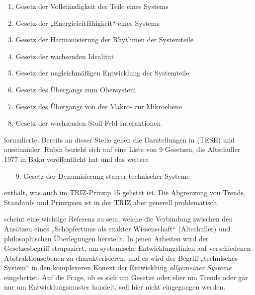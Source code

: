 \documentclass[11pt,a4paper]{article}
\begin{document}
\begin{enumerate}[noitemsep]
\item Gesetz der Vollständigkeit der Teile eines Systems
\item Gesetz der „Energieleitfähigkeit“ eines Systems
\item Gesetz der Harmonisierung der Rhythmen der Systemteile
\item Gesetz der wachsenden Idealität
\item Gesetz der ungleichmäßigen Entwicklung der Systemteile
\item Gesetz des Übergangs zum Obersystem
\item Gesetz des Übergangs von der Makro- zur Mikroebene
\item Gesetz der wachsenden Stoff-Feld-Interaktionen
\end{enumerate}
formulierte. Bereits an dieser Stelle gehen die Darstellungen in (TESE) und
\cite{Rubin2019} auseinander. Rubin bezieht sich auf eine Liste von 9 Gesetzen,
die Altschuller 1977 in Baku veröffentlicht hat und das weitere
\begin{enumerate}[noitemsep]
\item[9.] Gesetz der Dynamisierung starrer technischer Systeme
\end{enumerate}
enthält, was auch im TRIZ-Prinzip 15 gelistet ist. Die Abgrenzung von Trends,
Standards und Prinzipien ist in der TRIZ aber generell problematisch.

\cite{Goldovsky1983} scheint eine wichtige Referenz zu sein, welche die
Verbindung zwischen den Ansätzen eines „Schöpfertums als exakter Wissenschaft“
(Altschuller) und philosophischen Überlegungen herstellt.  In jenen Arbeiten
wird der Gesetzesbegriff strapaziert, um systemische Entwicklungslinien auf
verschiedenen Abstraktionsebenen zu charakterisieren, und es wird der Begriff
„technisches System“ in den komplexeren Konext der Entwicklung
\emph{allgemeiner Systeme} eingebettet. Auf die Frage, ob es sich um Gesetze
oder eher um Trends oder gar nur um Entwicklungsmuster handelt, soll hier
nicht eingegangen werden.
\end{document}
